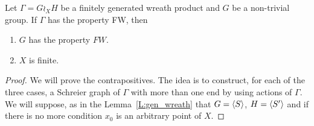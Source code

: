 \begin{lem}\label{Lem:Wreath_groups_ends}
Let $\Gamma = G \wr_X H$ be a finitely generated wreath product and $G$ be a non-trivial group. If $\Gamma$ has the property FW, then 
\begin{enumerate}
\item $G$ has the property $FW$.
\item $X$ is finite.
\end{enumerate}
%
\begin{proof}
We will prove the contrapositives. The idea is to construct, for each of the three cases, a Schreier graph of $\Gamma$ with more than one end by using actions of $\Gamma$. We will suppose, as in the Lemma~\ref{L:gen_wreath} that $G = \langle S\rangle$, $H = \langle S'\rangle$ and if there is no more condition $x_0$ is an arbitrary point of $X$.


\end{proof}
\end{lem}
